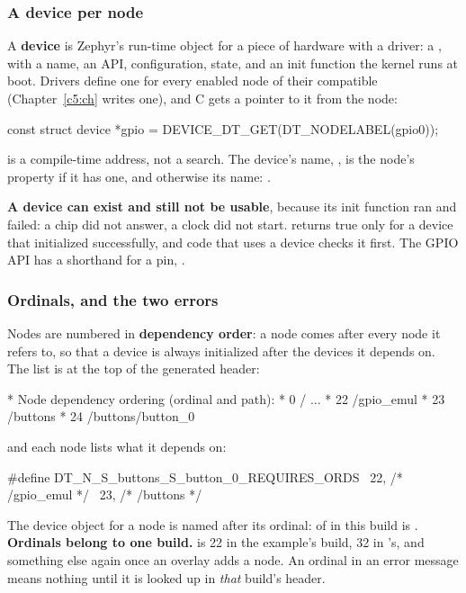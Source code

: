 \subsubsection{A device per node}
A \textbf{device} is Zephyr’s run-time object for a piece of hardware with a driver: a , with a name, an API, configuration, state, and an init function the kernel runs at boot.
Drivers define one for every enabled node of their compatible (Chapter~\ref{c5:ch} writes one), and
C gets a pointer to it from the node:

\begin{ccode}
const struct device *gpio = DEVICE_DT_GET(DT_NODELABEL(gpio0));
\end{ccode}

 is a compile-time address, not a search. The device’s name,
, is the node’s  property if it has one, and otherwise its name:
.

\textbf{A device can exist and still not be usable}, because its init function ran and failed: a
chip did not answer, a clock did not start.  returns true only for a device
that initialized successfully, and code that uses a device checks it first. The GPIO API has a
shorthand
for a pin, .

\subsubsection{Ordinals, and the two errors}
Nodes are numbered in \textbf{dependency order}: a node comes after every node it refers to, so that
a device is always initialized after the devices it depends on. The list is at the top of the
generated header:

\begin{console}
 * Node dependency ordering (ordinal and path):
 *   0   /
 ...
 *   22  /gpio_emul
 *   23  /buttons
 *   24  /buttons/button_0
\end{console}

and each node lists what it depends on:

\begin{ccode}
#define DT_N_S_buttons_S_button_0_REQUIRES_ORDS \
	22, /* /gpio_emul */ \
	23, /* /buttons */
\end{ccode}

The device object for a node is named after its ordinal:  of 
in this
build is \code{&__device_dts_ord_22}. \textbf{Ordinals belong to one build.} \code{/gpio_emul} is 22 in the
 example’s build, 32 in ’s, and something else again once an overlay adds
a node. An ordinal in an error message means nothing until it is looked up in \emph{that} build’s
header.

